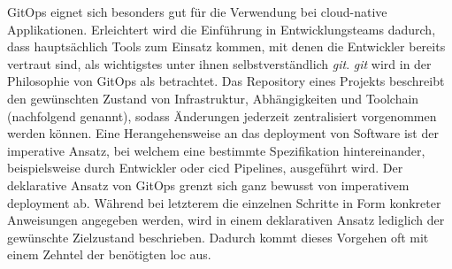 GitOps eignet sich besonders gut für die Verwendung bei \gls{cloud-native} Applikationen. Erleichtert wird die Einführung in Entwicklungsteams dadurch, dass hauptsächlich Tools zum Einsatz kommen, mit denen die Entwickler bereits vertraut sind, als wichtigstes unter ihnen selbstverständlich \textit{\Gls{git}}. \cite{109:GitOps} \textit{\Gls{git}} wird in der Philosophie von GitOps als  betrachtet. Das Repository eines Projekts beschreibt den gewünschten Zustand von Infrastruktur, Abhängigkeiten und Toolchain (nachfolgend  genannt), sodass Änderungen jederzeit zentralisiert vorgenommen werden können. \cite{007:Analysis-of-Declarative-and-Pull-based-Deployment-Models-on-GitOps,010:Efficient-Application-Deployment-GitOps-for-Faster-and-Secure-CI-CD-Cycles,109:GitOps} Eine Herangehensweise an das \Gls{deployment} von Software ist der imperative Ansatz, bei welchem eine bestimmte Spezifikation hintereinander, beispielsweise durch Entwickler oder \Gls{cicd} Pipelines, ausgeführt wird. Der deklarative Ansatz von GitOps grenzt sich ganz bewusst von imperativem \Gls{deployment} ab. Während bei letzterem die einzelnen Schritte in Form konkreter Anweisungen angegeben werden, wird in einem deklarativen Ansatz lediglich der gewünschte Zielzustand beschrieben. Dadurch kommt dieses Vorgehen oft mit einem Zehntel der benötigten \Gls{loc} aus. \cite{007:Analysis-of-Declarative-and-Pull-based-Deployment-Models-on-GitOps}

